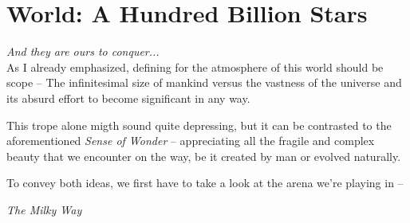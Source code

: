 \chapter{World: A Hundred Billion Stars}

\emph{And they are ours to conquer...}\\

As I already emphasized, defining for the atmosphere of this world should be
scope -- The infinitesimal size of mankind versus the vastness of the
universe and its absurd effort to become significant in any way.

This trope alone migth sound quite depressing, but it can be contrasted to the
aforementioned \emph{Sense of Wonder} -- appreciating all the fragile and
complex beauty that we encounter on the way, be it created by man or evolved
naturally.

To convey both ideas, we first have to take a look at the arena we're playing
in --

\emph{The Milky Way}
